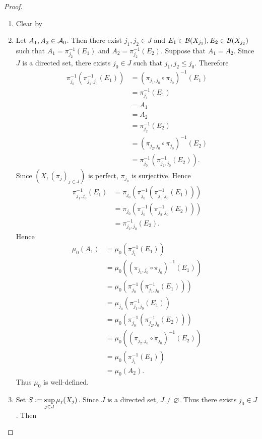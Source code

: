 \documentclass{book}
\begin{document}
\begin{proof}\
	\begin{enumerate}
		\item Clear by 
		\item Let $A_1, A_2 \in \mathcal{A}_0$. Then there exist $j_1, j_2 \in J$ and $E_1 \in \mathcal{B}(X_{j_1}) , E_2 \in \mathcal{B}(X_{j_2})$ such that $A_1 = \pi_{j_2}^{-1}(E_1)$ and $A_2 = \pi_{j_2}^{-1}(E_2)$. Suppose that $A_1 = A_2$. Since $J$ is a directed set, there exists $j_0 \in J$ such that $j_1, j_2 \leq j_0$. Therefore 
		\begin{align*}
			\pi_{j_0}^{-1}(\pi_{j_1, j_0}^{-1}(E_1)) 
			& = (\pi_{j_1, j_0} \circ \pi_{j_0})^{-1}(E_1) \\
			& = \pi_{j_1}^{-1}(E_1) \\
			& = A_1 \\
			& = A_2 \\
			& = \pi_{j_2}^{-1}(E_2) \\
			& = (\pi_{j_2, j_0} \circ \pi_{j_0})^{-1}(E_2) \\
			& = \pi_{j_0}^{-1}(\pi_{j_2, j_0}^{-1}(E_2)).
		\end{align*}
		Since $(X, (\pi_j)_{j \in J})$ is perfect, $\pi_{j_0}$ is surjective. Hence 
		\begin{align*}
			\pi_{j_1, j_0}^{-1}(E_1)
			& = \pi_{j_0}(\pi_{j_0}^{-1}(\pi_{j_1, j_0}^{-1}(E_1))) \\
			& = \pi_{j_0}(\pi_{j_0}^{-1}(\pi_{j_2, j_0}^{-1}(E_2))) \\
			& = \pi_{j_2, j_0}^{-1}(E_2).
		\end{align*} 
		Hence 
		\begin{align*}
			\mu_0(A_1)
			& = \mu_0(\pi_{j_1}^{-1}(E_1)) \\
			& = \mu_0((\pi_{j_1, j_0} \circ \pi_{j_0})^{-1}(E_1)) \\
			& = \mu_0(\pi_{j_0}^{-1}(\pi_{j_1, j_0}^{-1}(E_1))) \\
			& = \mu_{j_0}(\pi_{j_1, j_0}^{-1}(E_1)) \\
			& = \mu_0(\pi_{j_0}^{-1}(\pi_{j_2, j_0}^{-1}(E_2))) \\
			& = \mu_0((\pi_{j_2, j_0} \circ \pi_{j_0})^{-1}(E_2)) \\
			& = \mu_0(\pi_{j_1}^{-1}(E_1)) \\
			& = \mu_0(A_2).
		\end{align*}
		Thus $\mu_0$ is well-defined.
		\item Set $S \vcentcolon= \sup\limits_{j \in J} \mu_j(X_j)$. Since $J$ is a directed set, $J \neq \varnothing$. Thus there exists $j_0 \in J$. Then

\end{enumerate}
\end{proof}
\end{document}
